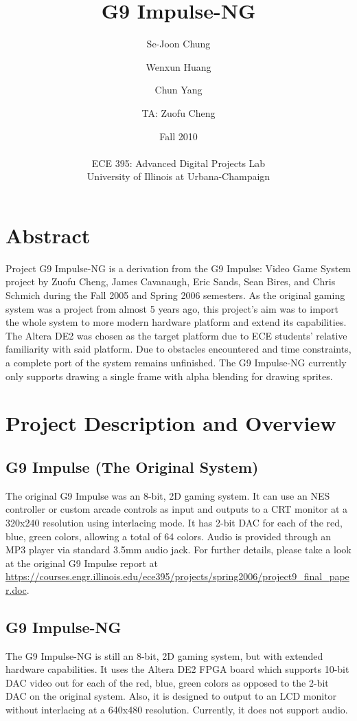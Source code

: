 \documentclass{report}
\title{G9 Impulse-NG}
\author{Se-Joon Chung \and Wenxun Huang \and Chun Yang \and TA: Zuofu Cheng}
\date{Fall 2010 \\ \hfill \\ ECE 395: Advanced Digital Projects Lab \\ University of Illinois at Urbana-Champaign}
\begin{document}
\maketitle
\newpage

\section*{Abstract}
Project G9 Impulse-NG is a derivation from the G9 Impulse: Video Game 
System project by Zuofu Cheng, James Cavanaugh, Eric Sands, Sean Bires, 
and Chris Schmich during the Fall 2005 and Spring 2006 semesters. As 
the original gaming system was a project from almost 5 years ago, this 
project's aim was to import the whole system to more modern hardware 
platform and extend its capabilities. The Altera DE2 was chosen as the
target platform due to ECE students' relative familiarity with said
platform. Due to obstacles encountered and time constraints, a complete
port of the system remains unfinished. The G9 Impulse-NG currently
only supports drawing a single frame with alpha blending for drawing
sprites.

\tableofcontents
\newpage

\section{Project Description and Overview}
\subsection{G9 Impulse (The Original System)}
The original G9 Impulse was an 8-bit, 2D gaming system. It can use an NES 
controller or custom arcade controls as input and outputs to a CRT
monitor at a 320x240 resolution using interlacing 
mode. It has 2-bit DAC for each of the red, blue, green colors, 
allowing a total of 64 colors. Audio is provided through an MP3 player 
via standard 3.5mm audio jack. For further details, please take a look 
at the original G9 Impulse report at 
\url{https://courses.engr.illinois.edu/ece395/projects/spring2006/project9\_final\_paper.doc}.

\subsection{G9 Impulse-NG}
The G9 Impulse-NG is still an 8-bit, 2D gaming system, but with extended 
hardware capabilities. It uses the Altera DE2 FPGA board which supports 
10-bit DAC video out for each of the red, blue, green colors as opposed 
to the 2-bit DAC on the original system. Also, it is designed to output 
to an LCD monitor without interlacing at a 640x480 resolution. Currently, it does 
not support audio.
\end{document}
